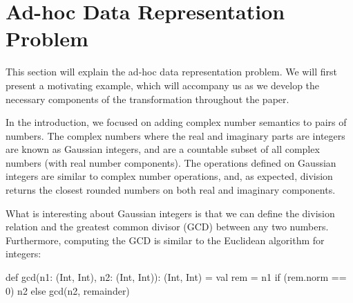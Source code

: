 \section{Ad-hoc Data Representation Problem}
\label{sec:problem}

This section will explain the ad-hoc data representation problem. We will first present a motivating example, which will accompany us as we develop the necessary components of the transformation throughout the paper.

In the introduction, we focused on adding complex number semantics to pairs of numbers. The complex numbers where the real and imaginary parts are integers are known as Gaussian integers, and are a countable subset of all complex numbers (with real number components). The operations defined on Gaussian integers are similar to complex number operations, and, as expected, division returns the closest rounded numbers on both real and imaginary components.


What is interesting about Gaussian integers is that we can define the division relation and the greatest common divisor (GCD) between any two numbers. Furthermore, computing the GCD is similar to the Euclidean algorithm for integers:

\begin{lstlisting-nobreak}
def gcd(n1: (Int, Int), n2: (Int, Int)): (Int, Int) = {
  val rem = n1 %
  if (rem.norm == 0) n2 else gcd(n2, remainder)
}
\end{lstlisting-nobreak}

